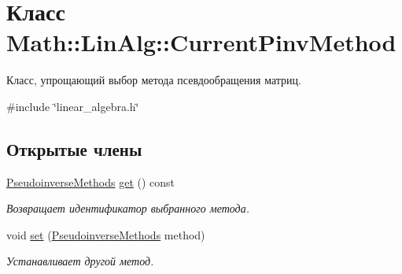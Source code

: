 \hypertarget{class_math_1_1_lin_alg_1_1_current_pinv_method}{}\section{Класс Math\+:\+:Lin\+Alg\+:\+:Current\+Pinv\+Method}
\label{class_math_1_1_lin_alg_1_1_current_pinv_method}


Класс, упрощающий выбор метода псевдообращения матриц.  




{\ttfamily \#include \char`\"{}linear\+\_\+algebra.\+h\char`\"{}}

\subsection*{Открытые члены}
\begin{DoxyCompactItemize}
\item 
\hyperlink{namespace_math_1_1_lin_alg_a34ee452c5d64eeb10e1bb63cf887af17}{Pseudoinverse\+Methods} \hyperlink{class_math_1_1_lin_alg_1_1_current_pinv_method_ad5d0948cdceee5f04825bac5e0a1a119}{get} () const \hypertarget{class_math_1_1_lin_alg_1_1_current_pinv_method_ad5d0948cdceee5f04825bac5e0a1a119}{}\label{class_math_1_1_lin_alg_1_1_current_pinv_method_ad5d0948cdceee5f04825bac5e0a1a119}

\begin{DoxyCompactList}\small\item\em Возвращает идентификатор выбранного метода. \end{DoxyCompactList}\item 
void \hyperlink{class_math_1_1_lin_alg_1_1_current_pinv_method_ade16b67d5062f609bb8488f2ed78f0f3}{set} (\hyperlink{namespace_math_1_1_lin_alg_a34ee452c5d64eeb10e1bb63cf887af17}{Pseudoinverse\+Methods} method)\hypertarget{class_math_1_1_lin_alg_1_1_current_pinv_method_ade16b67d5062f609bb8488f2ed78f0f3}{}\label{class_math_1_1_lin_alg_1_1_current_pinv_method_ade16b67d5062f609bb8488f2ed78f0f3}

\begin{DoxyCompactList}\small\item\em Устанавливает другой метод. \end{DoxyCompactList}\end{DoxyCompactItemize}
